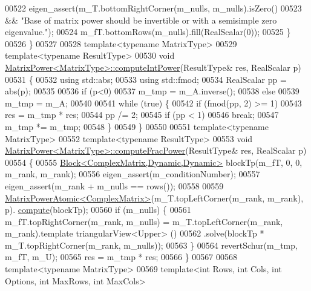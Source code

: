 \begin{DoxyCode}
00522     eigen\_assert(m\_T.bottomRightCorner(m\_nulls, m\_nulls).isZero()
00523         && \textcolor{stringliteral}{"Base of matrix power should be invertible or with a semisimple zero eigenvalue."});
00524     m\_fT.bottomRows(m\_nulls).fill(RealScalar(0));
00525   \}
00526 \}
00527 
00528 \textcolor{keyword}{template}<\textcolor{keyword}{typename} MatrixType>
00529 \textcolor{keyword}{template}<\textcolor{keyword}{typename} ResultType>
00530 \textcolor{keywordtype}{void} \hyperlink{class_eigen_1_1_matrix_power}{MatrixPower<MatrixType>::computeIntPower}(ResultType& res, 
      RealScalar p)
00531 \{
00532   \textcolor{keyword}{using} std::abs;
00533   \textcolor{keyword}{using} std::fmod;
00534   RealScalar pp = abs(p);
00535 
00536   \textcolor{keywordflow}{if} (p<0) 
00537     m\_tmp = m\_A.inverse();
00538   \textcolor{keywordflow}{else}     
00539     m\_tmp = m\_A;
00540 
00541   \textcolor{keywordflow}{while} (\textcolor{keyword}{true}) \{
00542     \textcolor{keywordflow}{if} (fmod(pp, 2) >= 1)
00543       res = m\_tmp * res;
00544     pp /= 2;
00545     \textcolor{keywordflow}{if} (pp < 1)
00546       \textcolor{keywordflow}{break};
00547     m\_tmp *= m\_tmp;
00548   \}
00549 \}
00550 
00551 \textcolor{keyword}{template}<\textcolor{keyword}{typename} MatrixType>
00552 \textcolor{keyword}{template}<\textcolor{keyword}{typename} ResultType>
00553 \textcolor{keywordtype}{void} \hyperlink{class_eigen_1_1_matrix_power}{MatrixPower<MatrixType>::computeFracPower}(ResultType& res, 
      RealScalar p)
00554 \{
00555   \hyperlink{group___core___module_class_eigen_1_1_block}{Block<ComplexMatrix,Dynamic,Dynamic>} blockTp(m\_fT, 0, 0, m\_rank, 
      m\_rank);
00556   eigen\_assert(m\_conditionNumber);
00557   eigen\_assert(m\_rank + m\_nulls == rows());
00558 
00559   \hyperlink{class_eigen_1_1_matrix_power_atomic}{MatrixPowerAtomic<ComplexMatrix>}(m\_T.topLeftCorner(m\_rank, m\_rank), p).
      \hyperlink{class_eigen_1_1_matrix_power_atomic_ac3cdfb54a5b60079d068784534cbc174}{compute}(blockTp);
00560   \textcolor{keywordflow}{if} (m\_nulls) \{
00561     m\_fT.topRightCorner(m\_rank, m\_nulls) = m\_T.topLeftCorner(m\_rank, m\_rank).template triangularView<Upper>
      ()
00562         .solve(blockTp * m\_T.topRightCorner(m\_rank, m\_nulls));
00563   \}
00564   revertSchur(m\_tmp, m\_fT, m\_U);
00565   res = m\_tmp * res;
00566 \}
00567 
00568 \textcolor{keyword}{template}<\textcolor{keyword}{typename} MatrixType>
00569 \textcolor{keyword}{template}<\textcolor{keywordtype}{int} Rows, \textcolor{keywordtype}{int} Cols, \textcolor{keywordtype}{int} Options, \textcolor{keywordtype}{int} MaxRows, \textcolor{keywordtype}{int} MaxCols>

\end{DoxyCode}
